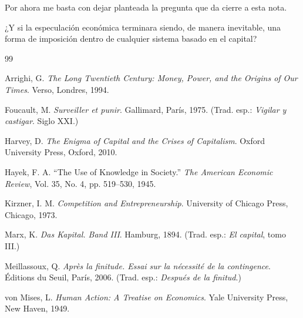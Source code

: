 \documentclass[12pt,a4paper]{article}
\begin{document}
Por ahora me basta con dejar planteada la pregunta que da cierre a esta nota.

¿Y si la especulación económica terminara siendo, de manera inevitable, una forma de imposición dentro de cualquier sistema basado en el capital?

\begin{thebibliography}{99}

Arrighi, G.
\textit{The Long Twentieth Century: Money, Power, and the Origins of Our Times}.
Verso, Londres, 1994.

Foucault, M.
\textit{Surveiller et punir}.
Gallimard, París, 1975.
(Trad. esp.: \textit{Vigilar y castigar}. Siglo XXI.)

Harvey, D.
\textit{The Enigma of Capital and the Crises of Capitalism}.
Oxford University Press, Oxford, 2010.

Hayek, F. A.
``The Use of Knowledge in Society.''
\textit{The American Economic Review},
Vol. 35, No. 4, pp. 519--530, 1945.

Kirzner, I. M.
\textit{Competition and Entrepreneurship}.
University of Chicago Press, Chicago, 1973.

Marx, K.
\textit{Das Kapital. Band III}.
Hamburg, 1894.
(Trad. esp.: \textit{El capital}, tomo III.)

Meillassoux, Q.
\textit{Après la finitude. Essai sur la nécessité de la contingence}.
Éditions du Seuil, París, 2006.
(Trad. esp.: \textit{Después de la finitud}.)

von Mises, L.
\textit{Human Action: A Treatise on Economics}.
Yale University Press, New Haven, 1949.

\end{thebibliography}
\end{document}
